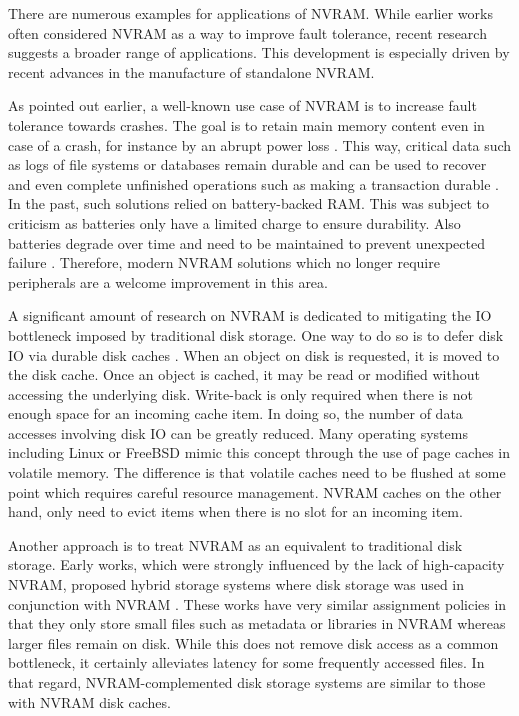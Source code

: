 There are numerous examples for applications of NVRAM. While earlier works often
considered NVRAM as a way to improve fault tolerance, recent research suggests
a broader range of applications. This development is especially driven by
recent advances in the manufacture of standalone NVRAM.

As pointed out earlier, a well-known use case of NVRAM is to increase fault
tolerance towards crashes. The goal is to retain main memory content even in
case of a crash, for instance by an abrupt power loss \cite{molina1992main,
eich1986main}. This way, critical data such as logs of file systems or databases
remain durable and can be used to recover and even complete unfinished
operations such as making a transaction durable \cite{liskov1991replication,
chen1996rio}. In the past, such solutions relied on battery-backed RAM. This was
subject to criticism as batteries only have a limited charge to ensure
durability. Also batteries degrade over time and need to be maintained to
prevent unexpected failure \cite{molina1992main}. Therefore, modern NVRAM
solutions which no longer require peripherals are a welcome improvement in this
area.

A significant amount of research on NVRAM is dedicated to mitigating the IO
bottleneck imposed by traditional disk storage. One way to do so is to defer
disk IO via durable disk caches \cite{chen1996rio, wu1994envy}. When an object
on disk is requested, it is moved to the disk cache. Once an object is cached,
it may be read or modified without accessing the underlying disk. Write-back is
only required when there is not enough space for an incoming cache item. In
doing so, the number of data accesses involving disk IO can be greatly reduced.
Many operating systems including Linux or FreeBSD mimic this concept through the
use of page caches in volatile memory. The difference is that volatile caches
need to be flushed at some point which requires careful resource management.
NVRAM caches on the other hand, only need to evict items when there is no slot
for an incoming item.

Another approach is to treat NVRAM as an equivalent to traditional disk storage.
Early works, which were strongly influenced by the lack of high-capacity NVRAM,
proposed hybrid storage systems where disk storage was used in conjunction with
NVRAM \cite{wang2002conquest, miller2001hermes}. These works have very similar
assignment policies in that they only store small files such as metadata or
libraries in NVRAM whereas larger files remain on disk. While this does not
remove disk access as a common bottleneck, it certainly alleviates latency for
some frequently accessed files. In that regard, NVRAM-complemented disk storage
systems are similar to those with NVRAM disk caches.

